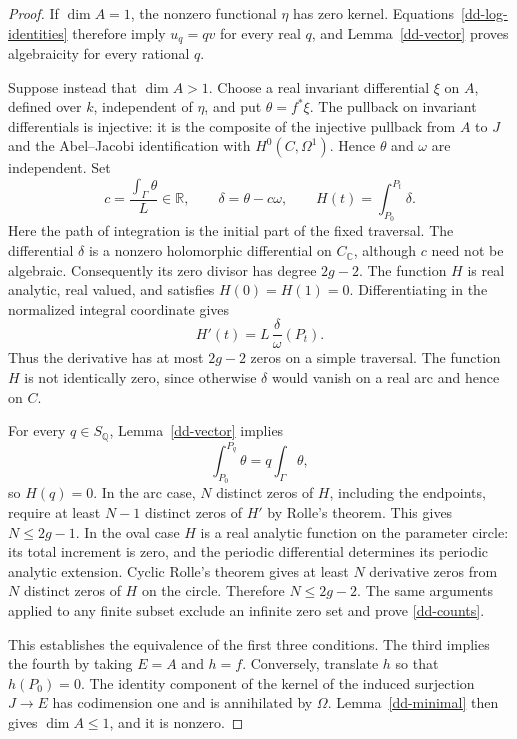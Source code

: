 \documentclass[11pt,a4paper]{article}
\theoremstyle{definition}
\theoremstyle{remark}
\numberwithin{equation}{section}
\begin{document}
\begin{proof}
If $\dim A=1$, the nonzero functional $\eta$ has zero kernel.
Equations~\eqref{dd-log-identities} therefore imply $u_q=qv$ for every
real $q$, and Lemma~\ref{dd-vector} proves algebraicity for every
rational $q$.

Suppose instead that $\dim A>1$.  Choose a real invariant differential
$\xi$ on $A$, defined over $k$, independent of $\eta$, and put
$\theta=f^*\xi$.  The pullback on invariant differentials is injective:
it is the composite of the injective pullback from $A$ to $J$ and the
Abel--Jacobi identification with $H^0(C,\Omega^1)$.  Hence $\theta$ and
$\omega$ are independent.  Set
\[
 c=\frac{\int_\Gamma\theta}{L}\in\mathbb R,\qquad
 \delta=\theta-c\omega,\qquad
 H(t)=\int_{P_0}^{P_t}\delta.
\]
Here the path of integration is the initial part of the fixed
traversal.  The differential $\delta$ is a nonzero holomorphic
differential on $C_{\mathbb C}$, although $c$ need not be algebraic.
Consequently its zero divisor has degree $2g-2$.  The function $H$ is
real analytic, real valued, and satisfies $H(0)=H(1)=0$.  Differentiating
in the normalized integral coordinate gives
\begin{equation}\label{dd-rolle-derivative}
 H'(t)=L\,\frac{\delta}{\omega}(P_t).
\end{equation}
Thus the derivative has at most $2g-2$ zeros on a simple traversal.
The function $H$ is not identically zero, since otherwise $\delta$
would vanish on a real arc and hence on $C$.

For every $q\in S_{\mathbb Q}$, Lemma~\ref{dd-vector} implies
\[
 \int_{P_0}^{P_q}\theta=q\int_\Gamma\theta,
\]
so $H(q)=0$.  In the arc case, $N$ distinct zeros of $H$, including the
endpoints, require at least $N-1$ distinct zeros of $H'$ by Rolle's
theorem.  This gives $N\le2g-1$.  In the oval case $H$ is a real
analytic function on the parameter circle: its total increment is
zero, and the periodic differential determines its periodic analytic
extension.  Cyclic Rolle's theorem gives at least $N$ derivative zeros
from $N$ distinct zeros of $H$ on the circle.  Therefore $N\le2g-2$.
The same arguments applied to any finite subset exclude an infinite
zero set and prove \eqref{dd-counts}.

This establishes the equivalence of the first three conditions.  The
third implies the fourth by taking $E=A$ and $h=f$.  Conversely,
translate $h$ so that $h(P_0)=0$.  The identity component of the kernel
of the induced surjection $J\to E$ has codimension one and is
annihilated by $\Omega$.
Lemma~\ref{dd-minimal} then gives $\dim A\le1$, and it is nonzero.
\end{proof}
\end{document}
